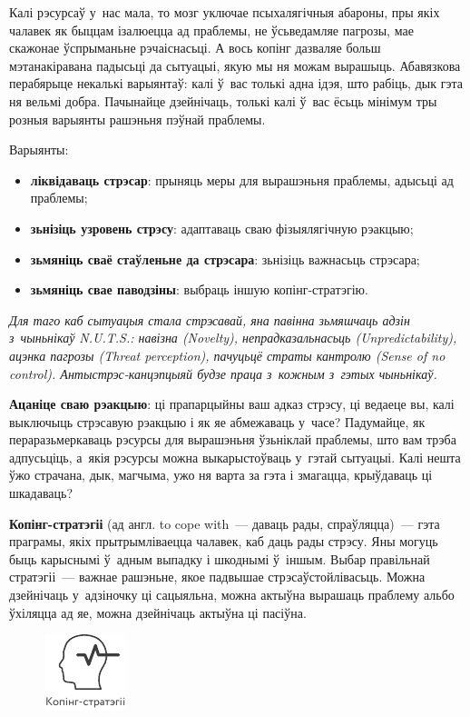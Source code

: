 Калі рэсурсаў у~нас мала, то мозг уключае псыхалягічныя абароны, пры якіх чалавек як быццам ізалюецца ад праблемы, не ўсьведамляе пагрозы, мае скажонае ўспрыманьне рэчаіснасьці. А вось копінг дазваляе больш мэтанакіравана падысьці да сытуацыі, якую мы ня можам вырашыць. Абавязкова перабярыце некалькі варыянтаў: калі ў~вас толькі адна ідэя, што рабіць, дык гэта ня вельмі добра. Пачынайце дзейнічаць, толькі калі ў~вас ёсьць мінімум тры розныя варыянты рашэньня пэўнай праблемы.

Варыянты: 
\begin{itemize}
  \item \textbf{ліквідаваць стрэсар}: прыняць меры для вырашэньня праблемы, адысьці ад праблемы;
  \item \textbf{зьнізіць узровень стрэсу}: адаптаваць сваю фізыялягічную рэакцыю;
  \item \textbf{зьмяніць сваё стаўленьне да стрэсара}: зьнізіць важнасьць стрэсара;
  \item \textbf{зьмяніць свае паводзіны}: выбраць іншую копінг-стратэгію.
\end{itemize}

\emph{Для таго каб сытуацыя стала стрэсавай, яна павінна зьмяшчаць адзін з~чыньнікаў N.U.T.S.: навізна (Novelty), непрадказальнасьць (Unpredictability), ацэнка пагрозы (Threat per\-cep\-tion), пачуцьцё страты кантролю (Sense of no control). Антыстрэс-канцэпцыяй будзе праца з~кожным з~гэтых чыньнікаў.}

\textbf{Ацаніце сваю рэакцыю}: ці прапарцыйны ваш адказ стрэсу, ці ведаеце вы, калі выключыць стрэсавую рэакцыю і як яе абмежаваць у~часе? Падумайце, як пераразьмеркаваць рэсурсы для вырашэньня ўзьніклай праблемы, што вам трэба адпусьціць, а~якія рэсурсы можна выкарыстоўваць у~гэтай сытуацыі. Калі нешта ўжо страчана, дык, магчыма, ужо ня варта за гэта і змагацца, крыўдаваць ці шкадаваць?

\textbf{Копінг-стратэгіі} (ад англ. to cope with~--- даваць рады, спраўляцца)~--- гэта праграмы, якіх прытрымліваецца чалавек, каб даць рады стрэсу. Яны могуць быць карыснымі ў~адным выпадку і шкоднымі ў~іншым. Выбар правільнай стратэгіі~--- важнае рашэньне, якое падвышае стрэсаўстойлівасьць. Можна дзейнічаць у~адзіночку ці сацыяльна, можна актыўна вырашаць праблему альбо ўхіляцца ад яе, можна дзейнічаць актыўна ці пасіўна.

\begin{figure}[htb!]
  \centering
  \includegraphics[scale=1.5]{willpower/ch7/13.pdf}
\end{figure}

